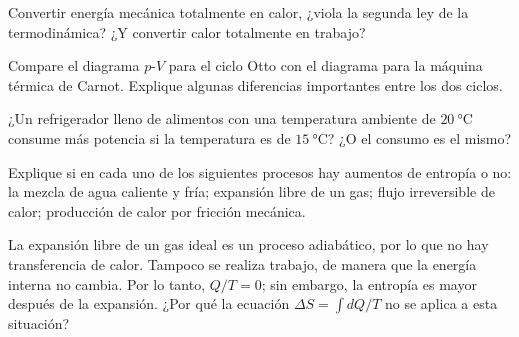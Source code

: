 %
\begin{center}
\end{center}
%
\begin{Exercise}
  Convertir energía mecánica totalmente en calor, ¿viola la segunda ley de la termodinámica? ¿Y convertir calor totalmente en trabajo?
\end{Exercise}
%
\begin{Exercise}
  Compare el diagrama $p$-$V$ para el ciclo Otto con el diagrama para la máquina térmica de Carnot. Explique algunas diferencias importantes entre los dos ciclos.
\end{Exercise}
%
\begin{Exercise}
  ¿Un refrigerador lleno de alimentos con una temperatura ambiente de $\SI{20}{\celsius}$ consume más potencia si la temperatura es de $\SI{15}{\celsius}$? ¿O el consumo es el mismo?
\end{Exercise}
%
\begin{Exercise}
  Explique si en cada uno de los siguientes procesos hay aumentos de entropía o no: la mezcla de agua caliente y fría; expansión libre de un gas; flujo irreversible de calor; producción de calor por fricción mecánica.
\end{Exercise}
%
\begin{Exercise}
  La expansión libre de un gas ideal es un proceso adiabático, por lo que no hay transferencia de calor. Tampoco se realiza trabajo, de manera que la energía interna no cambia. Por lo tanto, $Q/T = 0$; sin embargo, la entropía es mayor después de la expansión. ¿Por qué la ecuación $\Delta S = \int dQ/T$ no se aplica a esta situación?
\end{Exercise}
%
